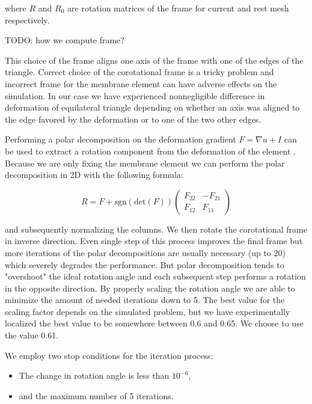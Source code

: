 \documentclass{egpubl}
\begin{document}
\noindent
where $R$ and $R_0$ are rotation matrices of the frame for current and rest
mesh respectively.

TODO: how we compute frame?



This choice of the frame aligns one axis of the frame with one of the edges
of the triangle. Correct choice of the corotational frame is a tricky
problem \cite{Felippa2005} and incorrect frame for the membrane element can
have adverse effects on the simulation. In our case we have experienced
nonnegligible difference in deformation of equilateral triangle depending
on whether an axis was aligned to the edge favored by the deformation or to
one of the two other edges.

Performing a polar decomposition on the deformation gradient $F = \nabla u
+ I$ can be used to extract a rotation component from the deformation of
the element \cite{Ciarlet1994}. Because we are only fixing the membrane
element we can perform the polar decomposition in 2D with the following
formula:

\begin{equation}
    R = F + \mathrm{sgn}(\mathrm{det}(F)) \begin{pmatrix}
        F_{22} & - F_{21} \\
        F_{12} & F_{11}
    \end{pmatrix}
\end{equation}

\noindent
and subsequently normalizing the columns. We then rotate the corotational
frame in inverse direction. Even single step of this process improves the
final frame but more iterations of the polar decompositions are usually
necessary (up to 20) which severely degrades the performance. But polar
decomposition tends to "overshoot" the ideal rotation angle and each
subsequent step performs a rotation in the opposite direction. By properly
scaling the rotation angle we are able to minimize the amount of needed
iterations down to 5. The best value for the scaling factor depends on the
simulated problem, but we have experimentally localized the best value to
be somewhere between 0.6 and 0.65. We choose to use the value 0.61.

We employ two stop conditions for the iteration process:
\begin{itemize}
    \item The change in rotation angle is less than $10^{-6}$,
    \item and the maximum number of 5 iterations.
\end{itemize}
\end{document}
